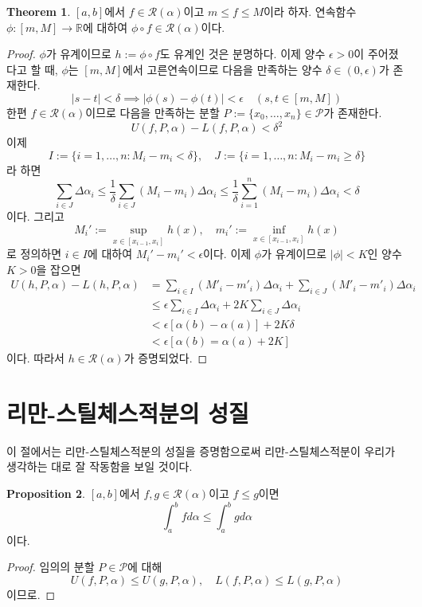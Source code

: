 \documentclass[11pt]{book}
\numberwithin{equation}{chapter}
\def\RR{\mathbb{R}}
\def\eps{\epsilon}
\def\calP{\mathcal{P}}
\def\calR{\mathcal{R}}
\newcommand{\abs}[1]{\left\vert#1\right\vert}
\theoremstyle{definition}
\newtheorem{thm}{Theorem}[section]
\newtheorem{prop}[thm]{Proposition}
\begin{document}
\begin{thm} \label{9.2.4}
    \([a, b]\)에서 \(f \in \calR(\alpha)\)이고 \(m \le f \le M\)이라 하자. 연속함수 \(\phi : [m, M] \to \RR\)에 대하여 \(\phi \circ f \in \calR(\alpha)\)이다.
\end{thm}
\begin{proof}
    \(\phi\)가 유계이므로 \(h := \phi \circ f\)도 유계인 것은 분명하다. 이제 양수 \(\eps > 0\)이 주어졌다고 할 때, \(\phi\)는 \([m, M]\)에서 고른연속이므로 다음을 만족하는 양수 \(\delta \in (0, \eps)\)가 존재한다.
    \[
        \abs{s - t} < \delta \implies \abs{\phi(s) - \phi(t)} < \eps \quad (s, t \in [m, M])
    \]
    한편 \(f \in \calR(\alpha)\)이므로 다음을 만족하는 분할 \(P := \{x_0, \ldots, x_n\} \in \calP\)가 존재한다.
    \[
        U(f, P, \alpha) - L(f, P, \alpha) < \delta^2
    \]
    이제
    \[
        I := \{i = 1, \ldots, n : M_i - m_i < \delta\}, \quad J := \{i = 1, \ldots, n : M_i - m_i \ge \delta\}
    \]
    라 하면
    \[
        \sum_{i \in J} \Delta \alpha_i \le \frac{1}{\delta} \sum_{i \in J} (M_i - m_i) \Delta \alpha_i  \le \frac{1}{\delta} \sum_{i =1}^n (M_i - m_i) \Delta \alpha_i < \delta
    \]
    이다. 그리고
    \[
        M_i' := \sup_{x \in [x_{i-1}, x_i]} h(x), \quad m_i' := \inf_{x \in [x_{i-1}, x_i]} h(x)
    \]
    로 정의하면 \(i \in I\)에 대하여 \(M_i' - m_i' < \eps\)이다. 이제 \(\phi\)가 유계이므로 \(\abs{\phi} < K\)인 양수 \(K > 0\)을 잡으면 
    \begin{align*}
        U(h, P, \alpha) - L(h, P, \alpha) &= \sum_{i \in I} (M'_i - m'_i) \Delta \alpha_i + \sum_{i \in J} (M'_i - m'_i) \Delta \alpha_i\\
        &\le \eps \sum_{i \in I} \Delta \alpha_i + 2K \sum_{i \in J} \Delta \alpha_i\\
        &< \eps[\alpha(b) - \alpha(a)] + 2K\delta\\
        &< \eps[\alpha(b) = \alpha(a) + 2K]
    \end{align*}
    이다. 따라서 \(h \in \calR(\alpha)\)가 증명되었다.
\end{proof}

\section{리만-스틸체스적분의 성질} \label{sec9.3}

이 절에서는 리만-스틸체스적분의 성질을 증명함으로써 리만-스틸체스적분이 우리가 생각하는 대로 잘 작동함을 보일 것이다.

\begin{prop}
    \([a, b]\)에서 \(f, g \in \calR(\alpha)\)이고 \(f \le g\)이면
    \[
        \int_a^b f d\alpha \le \int_a^b g d\alpha
    \]
    이다.
\end{prop}
\begin{proof}
    임의의 분할 \(P \in \calP\)에 대해
    \[
        U(f, P, \alpha) \le U(g, P, \alpha), \quad L(f, P, \alpha) \le L(g, P, \alpha)
    \]
    이므로.
\end{proof}
\end{document}
